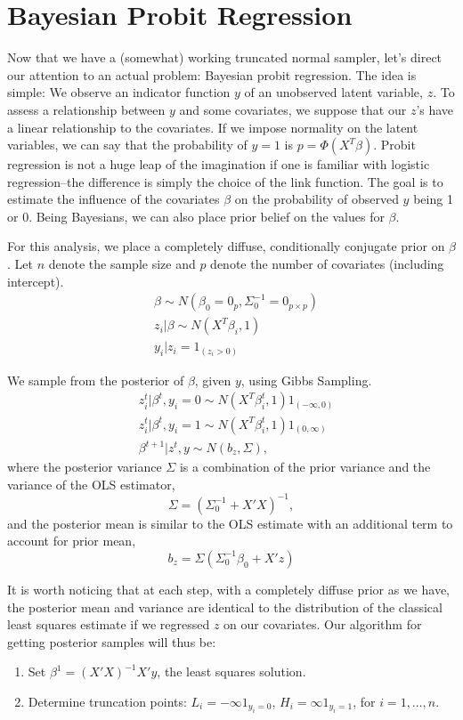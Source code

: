 \documentclass[12pt]{article}
\begin{document}
\section{Bayesian Probit Regression}
Now that we have a (somewhat) working truncated normal sampler, let's direct our attention to an actual problem: Bayesian probit regression. The idea is simple: We observe an indicator function $y$ of an unobserved latent variable, $z$. To assess a relationship between $y$ and some covariates, we suppose that our $z$'s have a linear relationship to the covariates. If we impose normality on the latent variables, we can say that the probability of $y=1$ is $p = \Phi(X^T \beta)$. Probit regression is not a huge leap of the imagination if one is familiar with logistic regression--the difference is simply the choice of the link function. The goal is to estimate the influence of the covariates $\beta$ on the probability of observed $y$ being 1 or 0. Being Bayesians, we can also place prior belief on the values for $\beta$.

For this analysis, we place a completely diffuse, conditionally conjugate prior on $\beta$. Let $n$ denote the sample size and $p$ denote the number of covariates (including intercept).
\begin{align*}
& \beta \sim N(\beta_0=0_p, \Sigma_0^{-1} = 0_{p \times p}) \\
& z_i | \beta \sim N(X^T \beta_i, 1) \\
& y_i | z_i = 1_{(z_i > 0)}
\end{align*}

We sample from the posterior of $\beta$, given $y$, using Gibbs Sampling.
\begin{align*}
& z_i^t | \beta^t, y_i=0 \sim N(X^T \beta_i^t, 1) 1_{(-\infty, 0)} \\
& z_i^t | \beta^t, y_i=1 \sim N(X^T \beta_i^t, 1) 1_{(0, \infty)} \\
& \beta^{t+1} | z^t, y \sim N(b_z, \Sigma),
\end{align*}
where the posterior variance $\Sigma$ is a combination of the prior variance and the variance of the OLS estimator,
\[ \Sigma = (\Sigma_0^{-1} + X'X)^{-1}, \]
and the posterior mean is similar to the OLS estimate with an additional term to account for prior mean,
\[ b_z = \Sigma (\Sigma_0^{-1} \beta_0 + X'z ) \]

It is worth noticing that at each step, with a completely diffuse prior as we have, the posterior mean and variance are identical to the distribution of the classical least squares estimate if we regressed $z$ on our covariates. Our algorithm for getting posterior samples will thus be:
\begin{enumerate}[A]
\item Set $\beta^1 = (X'X)^{-1} X'y$, the least squares solution.
\item Determine truncation points: $L_i = -\infty 1_{y_i = 0}$, $H_i = \infty 1_{y_i = 1}$, for $i=1, \dots, n$.
\end{enumerate}
\end{document}
